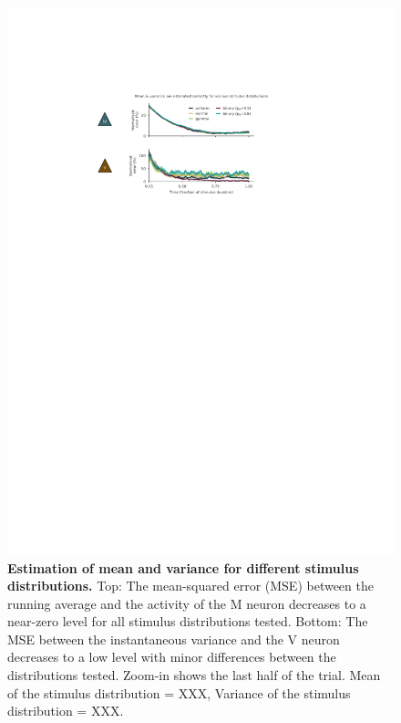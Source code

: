 \documentclass[10pt,a4paper,draft]{article}
\begin{document}
\begin{figure}[!h]
	\centering
    \includegraphics[scale=1]{../results/figures/final/Fig_2_S1}%
\caption{\footnotesize{\bf Estimation of mean and variance for different stimulus distributions.\newline}  
Top: The mean-squared error (MSE) between the running average and the activity of the M neuron decreases to a near-zero level for all stimulus distributions tested. 
Bottom: The MSE between the instantaneous variance and the V neuron decreases to a low level with minor differences between the distributions tested. Zoom-in shows the last half of the trial. Mean of the stimulus distribution = XXX, Variance of the stimulus distribution = XXX.
}
\label{fig:Fig_2_S1}
\end{figure}
\end{document}
